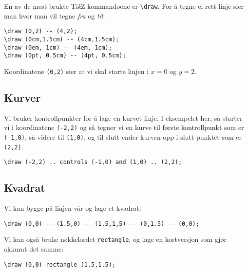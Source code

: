 \documentclass[11pt, a4paper]{article}
\newcommand{\TikZ}{Ti\textit{k}Z\xspace}
\begin{document}
En av de mest brukte \TikZ kommandoene er \texttt{\textbackslash draw}. For å tegne ei rett linje sier man hvor man vil tegne \textit{fra} og \textit{til}:

\begin{Verbatim}[fontsize=\small, frame=single]
\draw (0,2) -- (4,2);
\draw (0cm,1.5cm) -- (4cm,1.5cm);
\draw (0em, 1cm) -- (4em, 1cm);
\draw (0pt, 0.5cm) -- (4pt, 0.5cm);
\end{Verbatim}
Koordinatene \texttt{(0,2)} sier at vi skal starte linjen i $x=0$ og $y=2$.

\subsection{Kurver}
Vi bruker kontrollpunkter for å lage en kurvet linje. I eksempelet her, så starter vi i koordinatene \texttt{(-2,2)} og så tegner vi en kurve til første kontrollpunkt som er \texttt{(-1,0)}, så videre til \texttt{(1,0)}, og til slutt ender kurven opp i slutt-punktet som er \texttt{(2,2)}.

\begin{center}
\end{center}

\begin{Verbatim}[fontsize=\small]
\draw (-2,2) .. controls (-1,0) and (1,0) .. (2,2);
\end{Verbatim}

\newpage

\subsection{Kvadrat}
Vi kan bygge på linjen vår og lage et kvadrat:
\begin{center}
\end{center}

\begin{Verbatim}[fontsize=\small]
\draw (0,0) -- (1.5,0) -- (1.5,1,5) -- (0,1.5) -- (0,0);
\end{Verbatim}
Vi kan også bruke nøkkelordet \texttt{rectangle}, og lage en kortversjon som gjør akkurat det samme:
\begin{Verbatim}[fontsize=\small]
\draw (0,0) rectangle (1.5,1.5);
\end{Verbatim}
\end{document}
